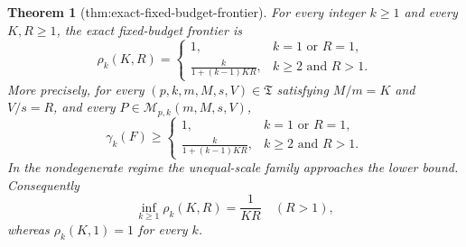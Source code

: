\documentclass{article}
\newtheorem{theorem}{Theorem}
\begin{document}
\begin{theorem}[thm:exact-fixed-budget-frontier]\label{thm:exact-fixed-budget-frontier}
For every integer \(k\ge1\) and every \(K,R\ge1\), the exact fixed-budget frontier is
\[
 \rho_k(K,R)=
 \begin{cases}
 1, & k=1\text{ or }R=1,\\[2mm]
 \displaystyle\frac{k}{1+(k-1)KR}, & k\ge2\text{ and }R>1.
\end{cases}
\]
More precisely, for every \((p,k,m,M,s,V)\in\mathfrak T\) satisfying \(M/m=K\) and \(V/s=R\), and every \(P\in\mathcal M_{p,k}(m,M,s,V)\),
\[
 \gamma_k(F)\ge
 \begin{cases}
 1, & k=1\text{ or }R=1,\\[2mm]
 \displaystyle\frac{k}{1+(k-1)KR}, & k\ge2\text{ and }R>1.
 \end{cases}
\]
In the nondegenerate regime the unequal-scale family approaches the lower bound.  Consequently
\[
 \inf_{k\ge1}\rho_k(K,R)=\frac1{KR}\quad(R>1),
\]
whereas \(\rho_k(K,1)=1\) for every \(k\).
\end{theorem}
\end{document}
